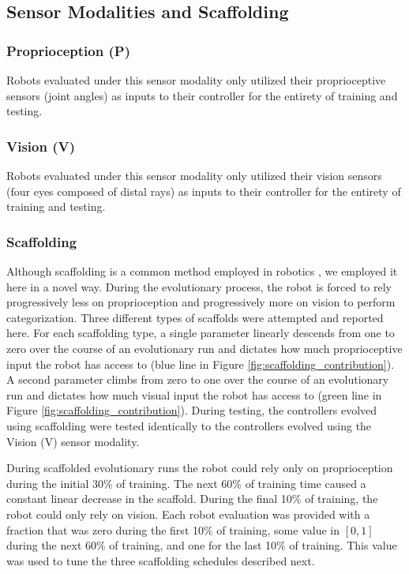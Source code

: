 \documentclass{sig-alternate}
\begin{document}
\subsection {Sensor Modalities and Scaffolding}

\subsubsection {Proprioception (P)}

Robots evaluated under this sensor modality only utilized their proprioceptive sensors (joint angles) as inputs to their controller for the entirety of training and testing. 

\subsubsection {Vision (V)}

Robots evaluated under this sensor modality only utilized their vision sensors (four eyes composed of distal rays) as inputs to their controller for the entirety of training and testing. 

\subsubsection {Scaffolding}

Although scaffolding is a common method employed in robotics \cite{dorigo1994robot, perkins1996robot, saksida1997shaping, bongard2011morphological, bongard2011morphologicalb},
we employed it here in a novel way. During the evolutionary process, the robot is forced to rely progressively less on proprioception and progressively more on vision to perform categorization. 
Three different types of scaffolds were attempted and reported here. For each scaffolding type, a single parameter linearly descends from one to zero over the course of an evolutionary run and dictates how much proprioceptive input the robot has access to (blue line in Figure \ref{fig:scaffolding_contribution}).
A second parameter climbs from zero to one over the course of 
an evolutionary run and dictates how much visual input the robot has access to (green line in Figure \ref{fig:scaffolding_contribution}). During testing, the controllers evolved using scaffolding were tested identically to the controllers evolved using the Vision (V) sensor modality. 

During scaffolded evolutionary runs the robot could rely only on proprioception during the initial 30\% of training. The next 60\% of training time caused a constant linear decrease in the scaffold.  During the final 10\% of training, the robot could only rely on vision.
Each robot evaluation was provided with a fraction that was zero during the first 10\% of training, some value in $[0,1]$ during the next 60\% of training, and one for the last 10\% of training.
This value was used to tune the three scaffolding schedules described next.
\end{document}
